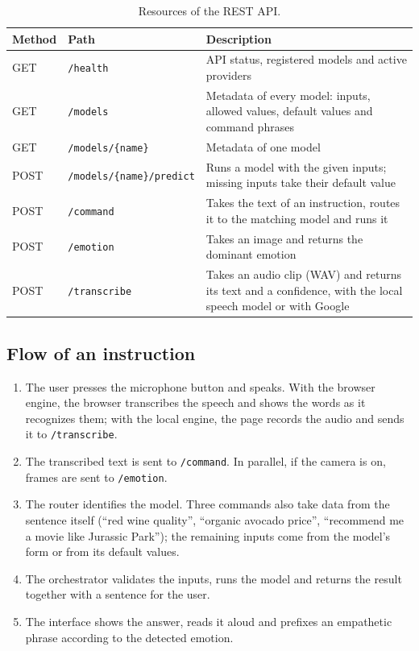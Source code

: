 \documentclass[11pt,letterpaper]{article}
\newcommand{\code}[1]{\texttt{#1}}
\begin{document}
\begin{table}[H]
\centering
\caption{Resources of the REST API.}
\label{tab:api}
\begin{tabularx}{\textwidth}{llX}
\toprule
Method & Path & Description \\
\midrule
GET & \code{/health} & API status, registered models and active providers \\
GET & \code{/models} & Metadata of every model: inputs, allowed values, default values and command phrases \\
GET & \code{/models/\{name\}} & Metadata of one model \\
POST & \code{/models/\{name\}/predict} & Runs a model with the given inputs; missing inputs take their default value \\
POST & \code{/command} & Takes the text of an instruction, routes it to the matching model and runs it \\
POST & \code{/emotion} & Takes an image and returns the dominant emotion \\
POST & \code{/transcribe} & Takes an audio clip (WAV) and returns its text and a confidence, with the local speech model or with Google \\
\bottomrule
\end{tabularx}
\end{table}

\subsection{Flow of an instruction}

\begin{enumerate}
\item The user presses the microphone button and speaks. With the browser engine, the browser transcribes the speech and shows the words as it recognizes them; with the local engine, the page records the audio and sends it to \code{/transcribe}.
\item The transcribed text is sent to \code{/command}. In parallel, if the camera is on, frames are sent to \code{/emotion}.
\item The router identifies the model. Three commands also take data from the sentence itself (``red wine quality'', ``organic avocado price'', ``recommend me a movie like Jurassic Park''); the remaining inputs come from the model's form or from its default values.
\item The orchestrator validates the inputs, runs the model and returns the result together with a sentence for the user.
\item The interface shows the answer, reads it aloud and prefixes an empathetic phrase according to the detected emotion.
\end{enumerate}
\end{document}
